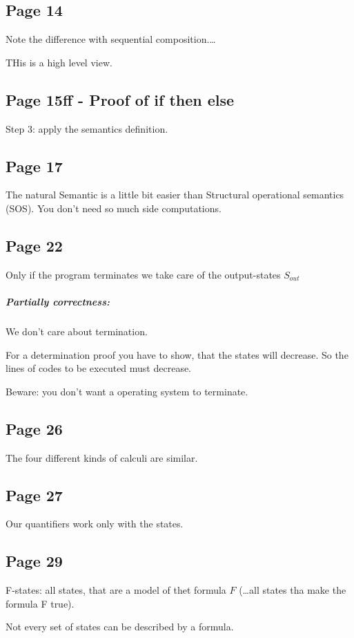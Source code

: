 \documentclass[a4paper]{article}
\begin{document}
\subsection{Page 14}
Note the difference with sequential composition.\ldots

THis is a high level view.

\subsection{Page 15ff - Proof of if then else}
Step 3: apply the semantics definition.


\subsection{Page 17}
The natural Semantic is a little bit easier than Structural operational
semantics (SOS). You don't need so much side computations.

\subsection{Page 22}
Only if the program terminates we take care of the output-states $S_{out}$

\subparagraph{Partially correctness:} We don't care about termination.

For a determination proof you have to show, that the states will decrease. So
the lines of codes to be executed must decrease.

Beware: you don't want a operating system to terminate.



\subsection{Page 26}
The four different kinds of calculi are similar.

\subsection{Page 27}
Our quantifiers work only with the states.

\subsection{Page 29}
F-states: all states, that are a model of thet formula $F$ (\ldots all states
tha make the formula F true).

Not every set of states can be described by a formula.
\end{document}
